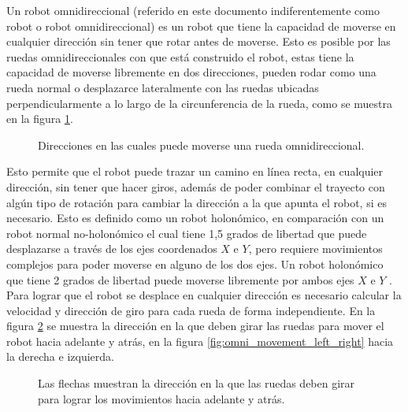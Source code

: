\documentclass{iccmemoria}
\begin{document}
Un robot omnidireccional (referido en este documento indiferentemente como robot o robot omnidireccional) es un robot que tiene la capacidad de moverse en cualquier dirección sin tener que rotar antes de moverse. Esto es posible por las ruedas omnidireccionales con que está construido el robot, estas tiene la capacidad de moverse libremente en dos direcciones, pueden rodar como una rueda normal o desplazarce lateralmente con las ruedas ubicadas perpendicularmente a lo largo de la circunferencia de la rueda, como se muestra en la figura \ref{fig:image_omni_whell}.\\

\begin{figure}[H]
  \centering
  
  \caption[Movimiento rueda omnidireccional.]{Direcciones en las cuales puede moverse una rueda omnidireccional.}
  \label{fig:image_omni_whell}
\end{figure}


Esto permite que el robot puede trazar un camino en línea recta, en cualquier dirección, sin tener que hacer giros, además de poder combinar el trayecto con algún tipo de rotación para cambiar la dirección a la que apunta el robot, si es necesario. Esto es definido como un robot holonómico, en comparación con un robot normal no-holonómico el cual tiene 1,5 grados de libertad que puede desplazarse a través de los ejes coordenados $X$ e $Y$, pero requiere movimientos complejos para poder moverse en alguno de los dos ejes. Un robot holonómico que tiene 2 grados de libertad puede moverse libremente por ambos ejes $X$ e $Y$ \cite{jayakody2015omnirobot}.\\

Para lograr que el robot se desplace en cualquier dirección es necesario calcular la velocidad y dirección de giro para cada rueda de forma independiente. En la figura \ref{fig:omni_movement_up_down} se muestra la dirección en la que deben girar las ruedas para mover el robot hacia adelante y atrás, en la figura \ref{fig:omni_movement_left_right} hacia la derecha e izquierda.

\begin{figure}[H]
  \centering
  \begin{footnotesize}
  
  \end{footnotesize}
  \caption[Movimiento hacia adelante y atrás del robot omnidireccional.]{Las flechas muestran la dirección en la que las ruedas deben girar para lograr los movimientos hacia adelante y atrás.}
  \label{fig:omni_movement_up_down}
\end{figure}
\end{document}
